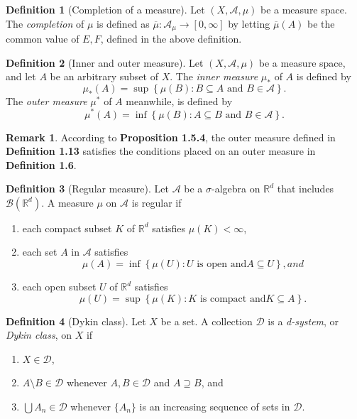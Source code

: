 \documentclass[12pt]{article}
\theoremstyle{definition}
\newtheorem{definition}{Definition}[section]
\newtheorem*{remark}{Remark}
\newcommand{\real}{\mathbb{R}}   %
\newcommand{\algebra}{\mathscr{A}}
\begin{document}
\begin{definition}[Completion of a measure]
    Let $(X,\algebra,\mu)$ be a measure space. The \textit{completion} of $\mu$ is defined as $\overline{\mu}:\algebra_\mu\to [0,\infty]$ by letting $\overline{\mu}(A)$ be the common value of $E,F$, defined in the above definition.
\end{definition}
\begin{definition}[Inner and outer measure]
    Let $(X,\algebra,\mu)$ be a measure space, and let $A$ be an arbitrary subset of $X$. The \textit{inner measure} $\mu_*$ of $A$ is defined by
    \begin{equation*}
        \mu_*(A)=\sup\left\{\mu(B):B\subseteq A \text{ and } B\in\algebra\right\}.
    \end{equation*}
    The \textit{outer measure} $\mu^*$ of $A$ meanwhile, is defined by
    \begin{equation*}
        \mu^*(A)=\inf\left\{\mu(B):A\subseteq B \text{ and } B\in\algebra\right\}.
    \end{equation*}
\end{definition}
\begin{remark}
    According to \textbf{Proposition 1.5.4}, the outer measure defined in \textbf{Definition 1.13} satisfies the conditions placed on an outer measure in \textbf{Definition 1.6}. 
\end{remark}
\begin{definition}[Regular measure]
    Let $\algebra$ be a $\sigma$-algebra on $\real^d$ that includes $\mathscr{B}(\real^d)$. A measure $\mu$ on $\algebra$ is regular if 
    \begin{enumerate}[label=(\alph*)]
        \item each compact subset $K$ of $\real^d$ satisfies $\mu(K)<\infty$,
        \item each set $A$ in $\algebra$ satisfies
        \begin{equation*}
            \mu(A)=\inf\left\{\mu(U):U \text{ is open and} A\subseteq U\right\}, and
        \end{equation*}
        \item each open subset $U$ of $\real^d$ satisfies
        \begin{equation*}
            \mu(U)=\sup\left\{\mu(K):K \text{ is compact and} K\subseteq A\right\}.
        \end{equation*}
    \end{enumerate}
\end{definition}
\begin{definition}[Dykin class]
    Let $X$ be a set. A collection $\mathscr{D}$ is a \textit{d-system}, or \textit{Dykin class}, on $X$ if
    \begin{enumerate}[label=(\alph*)]
        \item $X\in \mathscr{D}$,
        \item $A\setminus B \in \mathscr{D}$ whenever $A,B\in\mathscr{D}$ and $A\supseteq B$, and
        \item $\bigcup A_n \in \mathscr{D}$ whenever $\{A_n\}$ is an increasing sequence of sets in $\mathscr{D}$.
    \end{enumerate}
\end{definition}
\end{document}
